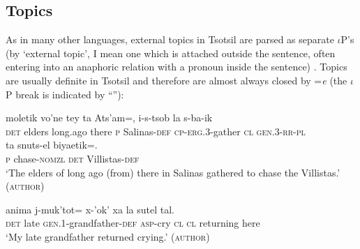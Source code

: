 \documentclass[output=paper,
modfonts
]{LSP/langsci}
\begin{document}
\subsection{Topics}
As in many other languages, external topics in Tsotsil are parsed as separate $\iota$P's  (by `external topic', I mean one which is attached
outside the sentence, often entering into an anaphoric relation with a pronoun inside the sentence) \citep{aissen1992}.  
Topics are usually definite in Tsotsil and therefore are almost always closed by =\emph{e}
(the $\iota$P break is indicated by ``\textbardbl''):
\begin{exe}
\ex\label{exe:top4}\bridgeoverex
\gll {} moletik vo'ne tey ta Ats'am=,  \textbardbl {}  i-s-tsob la s-ba-ik \\
\textsc{det} elders  long.ago there \textsc{p} Salinas-\textsc{def} {} \textsc{cp-erg.3}-gather \textsc{cl} \textsc{gen.3-rr-pl} \\
\glt {\vspace*{-3ex}}
\gll ta snuts-el    biyaetik=.  \\
 \textsc{p} chase-\textsc{nomzl}  \textsc{det} Villistas-\textsc{def} \\
\glt `The elders of long ago (from) there in Salinas gathered to chase the Villistas.' (\textsc{author})
\end{exe}
\begin{exe}
\ex\label{exe:top3}\bridgeoverex
\gll {} anima j-muk'tot=  \textbardbl {} x-'ok' xa la sutel tal. \\
\textsc{det} late \textsc{gen.1}-grandfather-\textsc{def} {} \textsc{asp}-cry \textsc{cl} \textsc{cl} returning here \\
\glt `My late grandfather returned crying.' (\textsc{author})
\end{exe}
\end{document}
